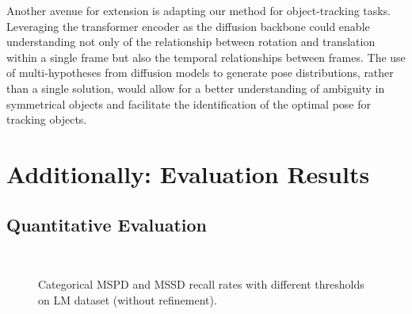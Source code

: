 \documentclass[12pt,DIV14,BCOR12mm,a4paper,footinclude=false,headinclude,parskip=half-,twoside,openright,cleardoublepage=empty,toc=index,bibliography=totoc,listof=totoc]{scrreprt}
\numberwithin{equation}{chapter}
\begin{document}
Another avenue for extension is adapting our method for object-tracking tasks. Leveraging the transformer encoder as the diffusion backbone could enable understanding not only of the relationship between rotation and translation within a single frame but also the temporal relationships between frames. The use of multi-hypotheses from diffusion models to generate pose distributions, rather than a single solution, would allow for a better understanding of ambiguity in symmetrical objects and facilitate the identification of the optimal pose for tracking objects.



\appendix
\chapter{Additionally: Evaluation Results}
\section{Quantitative Evaluation}
\begin{figure}[H]
	\centering
	\\
  \centering
	\caption{Categorical MSPD and MSSD recall rates with different thresholds on LM dataset (without refinement).}
	\label{img:eval_threshold}
\end{figure}
\end{document}
